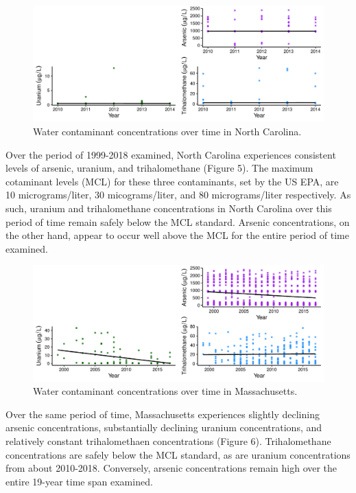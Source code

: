 \documentclass[12pt,]{article}
\begin{document}
\begin{figure}
\centering
\includegraphics{Project_Template_files/figure-latex/figs5-1.pdf}
\caption{Water contaminant concentrations over time in North Carolina.}
\end{figure}

Over the period of 1999-2018 examined, North Carolina experiences
consistent levels of arsenic, uranium, and trihalomethane (Figure 5).
The maximum cotaminant levels (MCL) for these three contaminants, set by
the US EPA, are 10 micrograms/liter, 30 micograms/liter, and 80
micrograms/liter respectively. As such, uranium and trihalomethane
concentrations in North Carolina over this period of time remain safely
below the MCL standard. Arsenic concentrations, on the other hand,
appear to occur well above the MCL for the entire period of time
examined.

\newpage

\begin{figure}
\centering
\includegraphics{Project_Template_files/figure-latex/figs6-1.pdf}
\caption{Water contaminant concentrations over time in Massachusetts.}
\end{figure}

Over the same period of time, Massachusetts experiences slightly
declining arsenic concentrations, substantially declining uranium
concentrations, and relatively constant trihalomethaen concentrations
(Figure 6). Trihalomethane concentrations are safely below the MCL
standard, as are uranium concentrations from about 2010-2018.
Conversely, arsenic concentrations remain high over the entire 19-year
time span examined.
\end{document}
